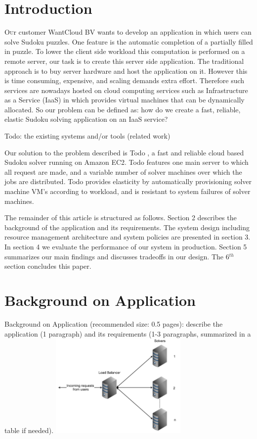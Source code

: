 \documentclass[twoside]{article}
\newcommand{\appName}{Todo }
\begin{document}
\begin{multicols}{2} %

\section{Introduction}

\lettrine[nindent=0em,lines=3]{O}ur customer WantCloud BV wants to develop an application in which users can solve Sudoku puzzles. One feature is the automatic completion of a partially filled in puzzle. To lower the client side workload this computation is performed on a remote server, our task is to create this server side application. The traditional approach is to buy server hardware and host the application on it. However this is time consuming, expensive, and scaling demands extra effort. Therefore such services are nowadays hosted on cloud computing services such as Infrastructure as a Service (IaaS) in which provides virtual machines that can be dynamically allocated. So our problem can be defined as: how do we create a fast, reliable, elastic Sudoku solving application on an IaaS service?

Todo: the existing systems and/or tools (related work)

Our solution to the problem described is \appName, a fast and reliable cloud based Sudoku solver running on Amazon EC2\cite{ec2}. 
\appName features one main server to which all request are made, and a variable number of solver machines over which the jobs are distributed. \appName provides elasticity by automatically provisioning solver machine VM's according to workload, and is resistant to system failures of solver machines.

The remainder of this article is structured as follows. Section 2 describes the background of the application and its requirements. The system design including resource management architecture and system policies are presented in section 3. In section 4 we evaluate the performance of our system in production. Section 5 summarizes our main findings and discusses tradeoffs in our design. The 6$^{th}$ section concludes this paper. 


\section{Background on Application}
Background on Application (recommended size: 0.5 pages): describe the application (1 paragraph) and its requirements (1-3 paragraphs, summarized in a table if needed).
\includegraphics[width=0.5\textwidth]{img/arch}




\end{multicols}
\end{document}
